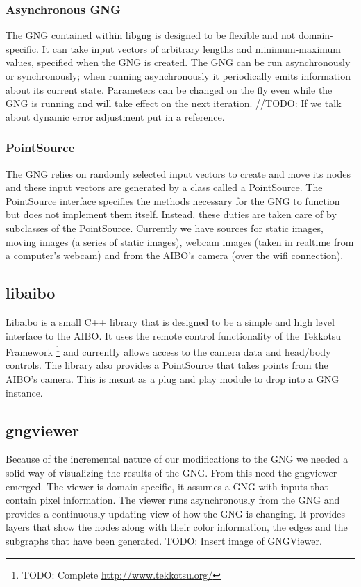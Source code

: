 \documentclass{article}
\renewcommand{\|}{\origbar} %
\begin{document}
\subsubsection{Asynchronous GNG}

The GNG contained within libgng is designed to be flexible and not domain-specific. It can take input vectors of arbitrary lengths and minimum-maximum values, specified when the GNG is created. The GNG can be run asynchronously or synchronously; when running asynchronously it periodically emits information about its current state. Parameters can be changed on the fly even while the GNG is running and will take effect on the next iteration. //TODO: If we talk about dynamic error adjustment put in a reference.

\subsubsection{PointSource}

The GNG relies on randomly selected input vectors to create and move its nodes and these input vectors are generated by a class called a PointSource. The PointSource interface specifies the methods necessary for the GNG to function but does not implement them itself. Instead, these duties are taken care of by subclasses of the PointSource. Currently we have sources for static images, moving images (a series of static images), webcam images (taken in realtime from a computer's webcam) and from the AIBO's camera (over the wifi connection).

\subsection{libaibo}

Libaibo is a small C++ library that is designed to be a simple and high level interface to the AIBO. It uses the remote control functionality of the Tekkotsu Framework \footnote{TODO: Complete \url{http://www.tekkotsu.org/}} and currently allows access to the camera data and head/body controls. The library also provides a PointSource that takes points from the AIBO's camera. This is meant as a plug and play module to drop into a GNG instance. 

\subsection{gngviewer}

Because of the incremental nature of our modifications to the GNG we needed a solid way of visualizing the results of the GNG. From this need the gngviewer emerged. The viewer is domain-specific, it assumes a GNG with inputs that contain pixel information. The viewer runs asynchronously from the GNG and provides a continuously updating view of how the GNG is changing. It provides layers that show the nodes along with their color information, the edges and the subgraphs that have been generated. TODO: Insert image of GNGViewer.
\end{document}
